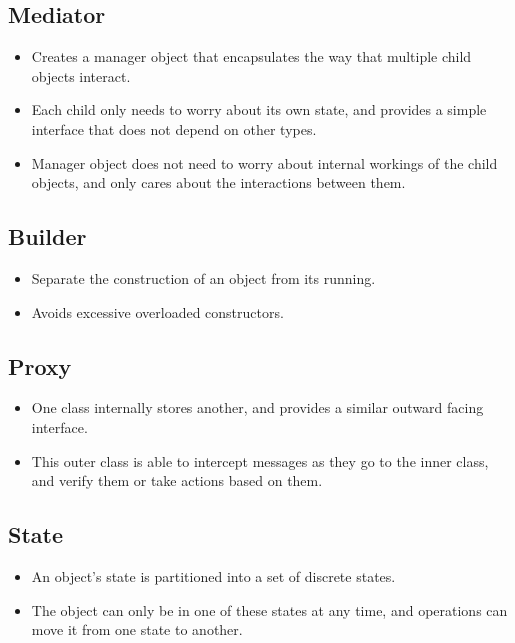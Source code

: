 \documentclass[landscape]{cheat}
\begin{document}
\begin{multicols*}{3}
\subsection{Mediator}
\begin{itemize}
    \item Creates a manager object that encapsulates the way that multiple child objects interact.
    \item Each child only needs to worry about its own state, and provides a simple interface that does not depend on other types.
    \item Manager object does not need to worry about internal workings of the child objects, and only cares about the interactions between them.
\end{itemize}

\subsection{Builder}
\begin{itemize}
    \item Separate the construction of an object from its running.
    \item Avoids excessive overloaded constructors.
\end{itemize}

\subsection{Proxy}
\begin{itemize}
    \item One class internally stores another, and provides a similar outward facing interface.
    \item This outer class is able to intercept messages as they go to the inner class, and verify them or take actions based on them.
\end{itemize}

\subsection{State}
\begin{itemize}
    \item An object's state is partitioned into a set of discrete states.
    \item The object can only be in one of these states at any time, and operations can move it from one state to another.
\end{itemize}


\end{multicols*}
\end{document}
